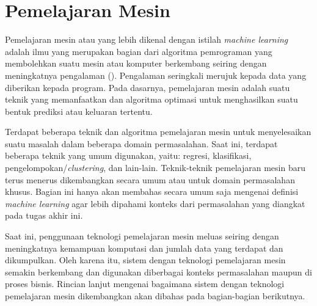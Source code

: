 \section{Pemelajaran Mesin}

Pemelajaran mesin atau yang lebih dikenal dengan istilah \textit{machine learning} adalah ilmu yang merupakan bagian dari algoritma pemrograman yang membolehkan suatu mesin atau komputer berkembang seiring dengan meningkatnya pengalaman (\cite{mitchell_1997}).
Pengalaman seringkali merujuk kepada data yang diberikan kepada program.
Pada dasarnya, pemelajaran mesin adalah suatu teknik yang memanfaatkan dan algoritma optimasi untuk menghasilkan suatu bentuk prediksi atau keluaran tertentu.

Terdapat beberapa teknik dan algoritma pemelajaran mesin untuk menyelesaikan suatu masalah dalam beberapa domain permasalahan.
Saat ini, terdapat beberapa teknik yang umum digunakan, yaitu: regresi, klasifikasi, pengelompokan/\textit{clustering}, dan lain-lain.
Teknik-teknik pemelajaran mesin baru terus menerus dikembangkan secara umum atau untuk domain permasalahan khusus.
Bagian ini hanya akan membahas secara umum saja mengenai definisi \textit{machine learning} agar lebih dipahami konteks dari permasalahan yang diangkat pada tugas akhir ini.

Saat ini, penggunaan teknologi pemelajaran mesin meluas seiring dengan meningkatnya kemampuan komputasi dan jumlah data yang terdapat dan dikumpulkan.
Oleh karena itu, sistem dengan teknologi pemelajaran mesin semakin berkembang dan digunakan diberbagai konteks permasalahan maupun di proses bisnis.
Rincian lanjut mengenai bagaimana sistem dengan teknologi pemelajaran mesin dikembangkan akan dibahas pada bagian-bagian berikutnya.
